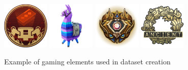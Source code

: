 \begin{figure}[H]
    \centering
    \includegraphics[width=0.2\textwidth]{ressources/iconexample1.png} \hfill
    \includegraphics[width=0.2\textwidth]{ressources/iconexample2.png} \hfill
    \includegraphics[width=0.2\textwidth]{ressources/iconexample3.png} \hfill
    \includegraphics[width=0.2\textwidth]{ressources/iconexample4.png} \hfill
    \caption{Example of gaming elements used in dataset creation}
    \label{fig:icons}
\end{figure}

